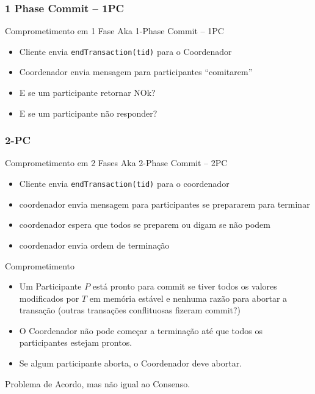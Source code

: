 \subsubsection{1 Phase Commit -- 1PC}
\begin{frame}[fragile]{Comprometimento em 1 Fase}
Aka 1-Phase Commit -- 1PC
\begin{itemize}
	\item Cliente envia \verb|endTransaction(tid)| para o Coordenador
	\item Coordenador envia mensagem para participantes ``comitarem'' \pause
	\item E se um participante retornar NOk? %
	\item E se um participante não responder?
\end{itemize}
\end{frame}

\subsubsection{2-PC}

\begin{frame}[fragile]{Comprometimento em 2 Fases}
Aka 2-Phase Commit -- 2PC

\begin{itemize}
	\item Cliente envia \verb|endTransaction(tid)| para o coordenador
	\item coordenador envia mensagem para participantes se prepararem para terminar
	\item coordenador espera que todos se preparem ou digam se não podem
	\item coordenador envia \alert{ordem} de terminação
\end{itemize}
\end{frame}


\begin{frame}{Comprometimento}
\begin{itemize}
	\item Um Participante $P$ está pronto para commit se tiver todos os valores modificados por $T$ em memória estável e nenhuma razão para abortar a transação (outras transações conflituosas fizeram commit?)
	\item O Coordenador não pode começar a terminação até que todos os participantes estejam prontos.
	\item Se algum participante aborta, o Coordenador deve abortar. 
\end{itemize}

Problema de Acordo, mas não igual ao Consenso.
\end{frame}


